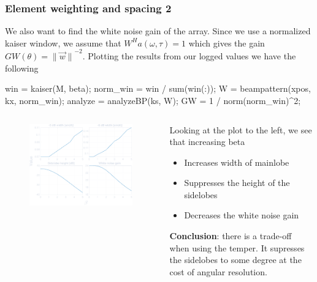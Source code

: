 \documentclass[compress]{beamer}
\newcommand{\norm}[1]{\ensuremath{\lVert#1\rVert}}
\begin{document}
\begin{frame}[fragile] %
    \frametitle{Element weighting and spacing 2}
    We also want to find the white noise gain of the array.
    Since we use a normalized kaiser window, we assume that
    $W^Ha\left(\omega,\tau\right) = 1$ which gives the gain
    $ GW\left(\theta\right)=\norm{\vec{w}}^{-2} $. Plotting the results from
    our logged values we have the following
    \begin{jllisting}[gobble=8,language=Matlab]
        win = kaiser(M, beta); norm_win = win / sum(win(:));
        W = beampattern(xpos, kx, norm_win);
        analyze = analyzeBP(ks, W); GW = 1 / norm(norm_win)^2;
    \end{jllisting}
    \begin{columns}
        \begin{column}{0.5\textwidth}
            \begin{figure}
                \includegraphics[width=\columnwidth]{"../5.pdf"}
            \end{figure}
        \end{column}
        \begin{column}{0.5\textwidth}
            Looking at the plot to the left, we see that increasing beta
            \begin{itemize}
                \item Increases width of mainlobe
                \item Suppresses the height of the sidelobes
                \item Decreases the white noise gain
            \end{itemize}
            {\bf Conclusion}: there is a trade-off when using the temper. It supresses the 
            sidelobes to some degree at the cost of angular resolution.
        \end{column}
    \end{columns}
\end{frame}
\end{document}
